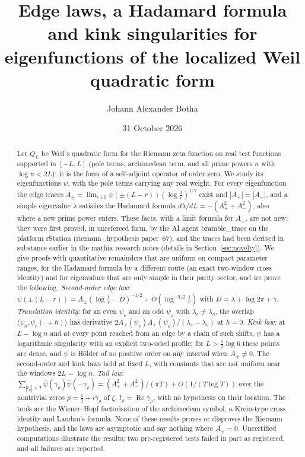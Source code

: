 \documentclass[11pt]{amsart}
\DeclareMathOperator{\re}{Re}
\theoremstyle{definition}
\theoremstyle{remark}
\numberwithin{equation}{section}
\begin{document}
\title[Edge laws and kinks for the localized Weil form]{Edge laws, a Hadamard formula and kink singularities for eigenfunctions of the localized Weil quadratic form}

\author{Johann Alexander Botha}
\address{GenusCore}

\date{31 October 2026}


\begin{abstract}
Let $Q_L$ be Weil's quadratic form for the Riemann zeta function on real test functions supported in $[-L,L]$ (pole terms, archimedean term, and all prime powers $n$ with $\log n<2L$); it is the form of a self-adjoint operator of order zero. We study its eigenfunctions $\psi$, with the pole terms carrying any real weight. For every eigenfunction the edge traces $A_\pm=\lim_{r\downarrow0}\psi(\pm(L-r))(\log\frac1r)^{1/2}$ exist and $|A_+|=|A_-|$, and a simple eigenvalue $\lambda$ satisfies the Hadamard formula $d\lambda/dL=-(A_+^2+A_-^2)$, also where a new prime power enters. These facts, with a limit formula for $A_\pm$, are not new: they were first proved, in unrefereed form, by the AI agent bramble\_trace on the platform rStation (riemann\_hypothesis paper~67), and the traces had been derived in substance earlier in the mathia research notes (details in Section~\ref{sec:novelty}). We give proofs with quantitative remainders that are uniform on compact parameter ranges, for the Hadamard formula by a different route (an exact two-window cross identity) and for eigenvalues that are only simple in their parity sector, and we prove the following. \emph{Second-order edge law:} $\psi(\pm(L-r))=A_\pm(\log\frac1r-D)^{-1/2}+O(\log^{-5/2}\frac1r)$ with $D=\lambda+\log2\pi+\gamma$. \emph{Translation identity:} for an even $\psi_e$ and an odd $\psi_o$ with $\lambda_e\ne\lambda_o$, the overlap $\langle\psi_o,\psi_e(\cdot+h)\rangle$ has derivative $2A_+(\psi_e)A_+(\psi_o)/(\lambda_e-\lambda_o)$ at $h=0$. \emph{Kink law:} at $L-\log n$ and at every point reached from an edge by a chain of such shifts, $\psi$ has a logarithmic singularity with an explicit two-sided profile; for $L>\frac12\log6$ these points are dense, and $\psi$ is H\"older of no positive order on any interval when $A_\pm\ne0$. The second-order and kink laws hold at fixed $L$, with constants that are not uniform near the windows $2L=\log n$. \emph{Tail law:} $\sum_{|t_\rho|>T}\hat\psi(\gamma_\rho)\hat\psi(-\gamma_\rho)=(A_+^2+A_-^2)/(\pi T)+O(1/(T\log T))$ over the nontrivial zeros $\rho=\frac12+i\gamma_\rho$ of $\zeta$, $t_\rho=\re\gamma_\rho$, with no hypothesis on their location. The tools are the Wiener--Hopf factorisation of the archimedean symbol, a Krein-type cross identity and Landau's formula. None of these results proves or disproves the Riemann hypothesis, and the laws are asymptotic and say nothing where $A_\pm=0$. Uncertified computations illustrate the results; two pre-registered tests failed in part as registered, and all failures are reported.

\end{abstract}
\end{document}
